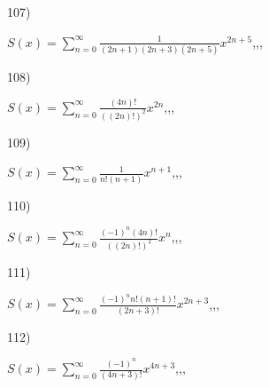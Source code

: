 \documentclass[11pt, ukrainian]{article}
\begin{document}
\par
\vspace{0.9cm}
107) \space 
{%
{$S(x)=\sum\limits_{n=0}^{\infty}{\frac{1}{(2n+1)(2n+3)(2n+5)}}{x^{{2n+5}}}$},,, \par \smallskip  
}
\par
\vspace{0.9cm}
108) \space 
{%
{$S(x)=\sum\limits_{n=0}^{\infty}{\frac{(4n)!}{{((2n)!)^2}}}{x^{{2n}}}$},,, \par \smallskip  
}
\par
\vspace{0.9cm}
109) \space 
{%
{$S(x)=\sum\limits_{n=0}^{\infty}{\frac{1}{n!(n+1)}}{x^{{n+1}}}$},,, \par \smallskip  
}
\par
\vspace{0.9cm}
110) \space 
{%
{$S(x)=\sum\limits_{n=0}^{\infty}{\frac{{(-1)^n}(4n)!}{{((2n)!)^2}}}{x^{{n}}}$},,, \par \smallskip  
}
\par
\newpage
111) \space 
{%
{$S(x)=\sum\limits_{n=0}^{\infty}{\frac{{(-1)^n}n!(n+1)!}{(2n+3)!}}{x^{{2n+3}}}$},,, \par \smallskip  
}
\par
\vspace{0.9cm}
112) \space 
{%
{$S(x)=\sum\limits_{n=0}^{\infty}{\frac{(-1)^n}{(4n+3)!}}{x^{{4n+3}}}$},,, \par \smallskip  
}
\end{document}
